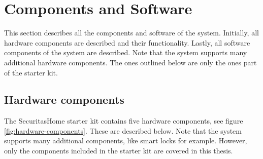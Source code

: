\section{Components and Software} \label{ch:system:components}
This section describes all the components and software of the system. Initially, all hardware components are described and their functionality. Lastly, all software components of the system are described. Note that the system supports many additional hardware components. The ones outlined below are only the ones part of the starter kit.

\subsection{Hardware components} \label{ch:system:hardware}
The SecuritasHome starter kit contains five hardware components, see figure \ref{fig:hardware-components}. These are described below. Note that the system supports many additional components, like smart locks for example. However, only the components included in the starter kit are covered in this thesis.
